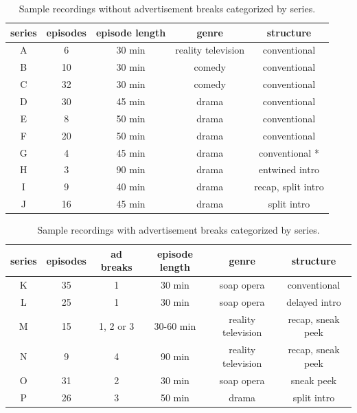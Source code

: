 \begin{table}[H]
  \begin{center}
    \begin{tabular}{|c|c|c|c|c|}
      \hline
      \textbf{series} & \textbf{episodes} & \textbf{episode length} & \textbf{genre} & \textbf{structure}
      \\ \hline
      A &  6 & 30 min & reality television & conventional
      \\ \hline
      B & 10 & 30 min & comedy & conventional
      \\ \hline
      C & 32 & 30 min & comedy & conventional
      \\ \hline
      D & 30 & 45 min & drama & conventional
      \\ \hline
      E &  8 & 50 min & drama & conventional
      \\ \hline
      F & 20 & 50 min & drama & conventional
      \\ \hline
      G &  4 & 45 min & drama & \hspace{3.3mm}conventional *
      \\ \hline
      H & 3 & 90 min & drama & entwined intro
      \\ \hline
      I &  9 & 40 min & drama & recap, split intro
      \\ \hline
      J &  16 & 45 min & drama & split intro
      \\ \hline
    \end{tabular}
  \end{center}
  \caption{Sample recordings without advertisement breaks categorized by series.}
  \label{tab:data_no_ads}
\end{table}

\begin{table}[H]
  \begin{center}
    \begin{tabular}{|c|c|c|c|c|c|}
      \hline
      \textbf{series} & \textbf{episodes} & \textbf{ad breaks} & \textbf{episode length} & \textbf{genre} & \textbf{structure}
      \\ \hline
      K & 35 & 1 & 30 min & soap opera & conventional
      \\ \hline
      L & 25 & 1 & 30 min & soap opera & delayed intro
      \\ \hline
      M & 15 & 1, 2 or 3 & 30-60 min & reality television & recap, sneak peek
      \\ \hline
      N &  9 & 4 & 90 min & reality television & recap, sneak peek
      \\ \hline
      O & 31 & 2 & 30 min & soap opera & sneak peek
      \\ \hline
      P & 26 & 3 & 50 min & drama & split intro
      \\ \hline
    \end{tabular}
  \end{center}
  \caption{Sample recordings with advertisement breaks categorized by series.}
  \label{tab:data_ads}
\end{table}

